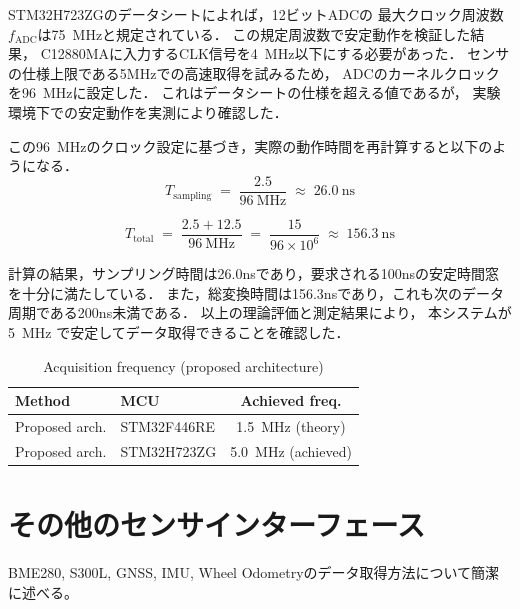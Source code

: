 \documentclass[main]{subfiles}
\begin{document}
STM32H723ZGのデータシート\cite{ref:stm32h723zg}によれば，12ビットADCの
最大クロック周波数$f_{\text{ADC}}$は\SI{75}{\mega\hertz}と規定されている．
この規定周波数で安定動作を検証した結果，
C12880MAに入力するCLK信号を\SI{4}{\mega\hertz}以下にする必要があった．
センサの仕様上限である5MHzでの高速取得を試みるため，
ADCのカーネルクロックを\SI{96}{\mega\hertz}に設定した．
これはデータシートの仕様を超える値であるが，
実験環境下での安定動作を実測により確認した．

この\SI{96}{\mega\hertz}のクロック設定に基づき，実際の動作時間を再計算すると以下のようになる．
\begin{equation}
  T_{\text{sampling}} \;=\; \frac{2.5}{\SI{96}{\mega\hertz}} \;\approx\; \SI{26.0}{\nano\second}
  \label{eq:T_sampling}
\end{equation}

\begin{equation}
  T_{\text{total}} \;=\; \frac{2.5 + 12.5}{\SI{96}{\mega\hertz}}
  \;=\; \frac{15}{96 \times 10^{6}} \;\approx\; \SI{156.3}{\nano\second}
  \label{eq:T_total}
\end{equation}

計算の結果，サンプリング時間は26.0nsであり，要求される100nsの安定時間窓を十分に満たしている．
また，総変換時間は156.3nsであり，これも次のデータ周期である200ns未満である．
以上の理論評価と測定結果により，
本システムが \SI{5}{\mega\hertz} で安定してデータ取得できることを確認した．


\begin{table}[t]
  \centering
  \caption{Acquisition frequency (proposed architecture)}
  \label{tab:new_method_result}
  \begingroup\setlength{\tabcolsep}{4pt}
  \begin{tabular}{l|l|c}
    \hline
    Method & MCU & Achieved freq. \\
    \hline\hline
    Proposed arch. & STM32F446RE & \SI{1.5}{\mega\hertz} (theory) \\
    Proposed arch. & STM32H723ZG & \SI{5.0}{\mega\hertz} (achieved) \\
    \hline
  \end{tabular}
  \endgroup
\end{table}

\section{その他のセンサインターフェース}
BME280, S300L, GNSS, IMU, Wheel Odometryのデータ取得方法について簡潔に述べる。
\end{document}
